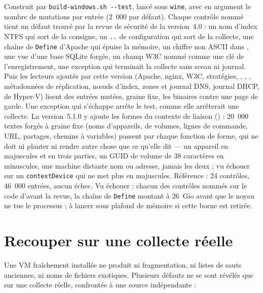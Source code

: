 \documentclass[11pt,a4paper,oneside]{report}
\begin{document}
Construit par \texttt{build-windows.sh -{}-test}, lancé sous \texttt{wine}, avec
en argument le nombre de mutations par entrée (2~000 par défaut). Chaque contrôle
nommé tient un défaut trouvé par la revue de sécurité de la version~4.0 : un nom
d'index NTFS qui sort de la consigne, un \texttt{..} de configuration qui sort de
la collecte, une chaîne de \texttt{Define} d'Apache qui épuise la mémoire, un
chiffre non ASCII dans , une vue d'une base SQLite forgée, un
champ W3C nommé comme une clé de l'enregistrement, une exception qui terminait la
collecte sans sceau ni journal.
Puis les lecteurs ajoutés par cette version (Apache, nginx, W3C, stratégies,
, , ,
métadonnées de réplication, nœuds d'index, zones et journal DNS, journal DHCP,
 de Hyper-V) lisent des entrées mutées, graine fixe,
les binaires contre une page de garde. Une exception qui s'échappe arrête le test,
comme elle arrêterait une collecte. La version~5.1.0 y ajoute les formes du
contexte de liaison () : 20~000 textes forgés à graine fixe
(noms d'appareils, de volumes, lignes de commande, URL, partages, chemins à
variables) passent par chaque fonction de forme, qui ne doit ni planter ni
rendre autre chose que ce qu'elle dit --- un appareil en majuscules et en trois
parties, un GUID de volume de 38 caractères en minuscules, une machine distante
nom ou adresse, jamais les deux ; vu échouer sur un \texttt{contextDevice} qui ne
met plus en majuscules. Référence : 24 contrôles, 46~000 entrées, aucun
échec. Vu échouer : chacun des contrôles nommés sur le code d'avant la revue, la
chaîne de \texttt{Define} montant à 26~Gio avant que le noyau ne tue le processus ;
à lancer sous plafond de mémoire si cette borne est retirée.

\chapter{Recouper sur une collecte réelle}

Une VM fraîchement installée ne produit ni fragmentation, ni listes de sauts
anciennes, ni noms de fichiers exotiques. Plusieurs défauts ne se sont révélés
que sur une collecte réelle, confrontée à une source indépendante :
\end{document}
